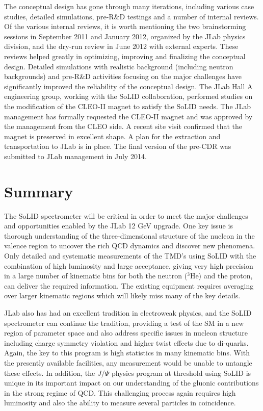 \documentclass[12pt]{article}
\begin{document}
The conceptual design has gone through many iterations, including  
various case studies, detailed simulations, pre-R\&D testings and a number of internal reviews.
Of the various internal reviews, it is worth mentioning the two brainstorming sessions in September 2011 and January 2012, organized 
by the JLab physics division, and the dry-run review in June 2012 with external experts. These reviews helped greatly in optimizing, improving and finalizing the conceptual design.
Detailed simulations with realistic background (including neutron backgrounds) and pre-R\&D activities focusing on the major challenges
 have significantly improved the reliability of the conceptual design. The JLab Hall A engineering group, working with the SoLID collaboration, performed studies on the modification of the CLEO-II magnet to satisfy the SoLID needs. The JLab management has formally requested the CLEO-II magnet and was approved by the management from the CLEO side. A recent site visit confirmed that the magnet is preserved in excellent shape. A plan for the extraction and transportation to JLab is in place.  
The final version of the pre-CDR\cite{pCDR} was submitted to JLab management in July 2014.

 \newpage

\section{Summary}

The SoLID spectrometer will be critical in order to meet the major 
challenges and opportunities enabled by the JLab 12 GeV upgrade. 
One key issue is thorough understanding of the three-dimensional structure of the nucleon in the valence region to uncover the rich QCD dynamics and discover new phenomena. Only detailed and systematic measurements of the TMD's using SoLID with the combination of high luminosity and large acceptance, giving very high precision 
in a large number of kinematic bins for both the neutron ($^3$He) and the proton, can deliver the required 
information. 
The existing equipment requires averaging over larger 
kinematic regions which will likely miss many of the key details.

 \newpage
JLab also has had an excellent tradition in electroweak physics, and the 
SoLID spectrometer can continue the tradition, providing a test of the 
SM in a new region of parameter space and also address specific issues 
in nucleon structure including charge symmetry violation and higher twist effects due to 
di-quarks.  Again, the key to this program is high statistics in many kinematic 
bins.  With the presently available facilities, any measurement would be 
unable to untangle these effects.  
 In addition, the $J/\Psi$ physics program at threshold using SoLID is unique in its important impact on our understanding of the gluonic contributions in the strong regime of QCD. This challenging process again requires 
high luminosity and also the ability to measure several particles in 
coincidence. 
 \newpage
\end{document}
